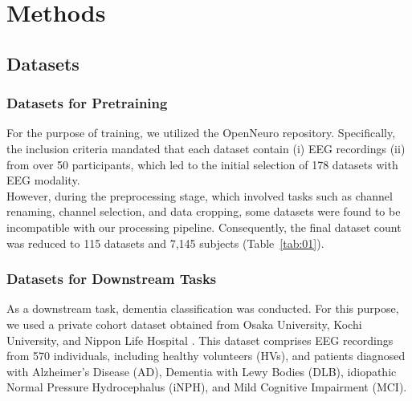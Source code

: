 \section{Methods}
\subsection{Datasets}
\subsubsection{Datasets for Pretraining}
For the purpose of training, we utilized the OpenNeuro repository. Specifically, the inclusion criteria mandated that each dataset contain (i) EEG recordings (ii) from over 50 participants, which led to the initial selection of 178 datasets with EEG modality. \cite{ds004902:1.0.0} \cite{ds004883:1.0.0} \cite{ds004771:1.0.0} \cite{ds004718:1.0.4} \cite{ds004626:1.0.2} \cite{ds004602:1.0.1} \cite{ds004595:1.0.0} \cite{ds004584:1.0.0} \cite{ds004580:1.0.0} \cite{ds004579:1.0.0} \cite{ds004577:1.0.1} \cite{ds004574:1.0.0} \cite{ds004572:1.2.0} \cite{ds004532:1.2.0} \cite{ds004515:1.0.0} \cite{ds004504:1.0.6} \cite{ds004448:1.0.2} \cite{ds004395:2.0.0} \cite{ds004362:1.0.0} \cite{ds004317:1.0.3} \cite{ds004315:1.0.0} \cite{ds004279:1.1.1} \cite{ds004256:1.0.5} \cite{ds004186:2.0.0} \cite{ds004166:1.0.0} \cite{ds004151:1.0.0} \cite{ds004148:1.0.1} \cite{ds004120:1.0.0} \cite{ds004118:1.0.1} \cite{ds004067:1.0.1} \cite{ds004019:1.0.0} \cite{ds003969:1.0.0} \cite{ds003947:1.0.1} \cite{ds003944:1.0.1} \cite{ds003838:1.0.5} \cite{ds003825:1.2.0} \cite{ds003775:1.2.1} \cite{ds003690:1.0.0} \cite{ds003655:1.0.2} \cite{ds003638:1.0.0} \cite{ds003602:1.0.1} \cite{ds003523:1.1.0} \cite{ds003522:1.1.0} \cite{ds003518:1.1.0} \cite{ds003509:1.1.0} \cite{ds003506:1.1.0} \cite{ds003490:1.1.0} \cite{ds003478:1.1.0} \cite{ds003474:1.1.0}
\\
\indent
However, during the preprocessing stage, which involved tasks such as channel renaming, channel selection, and data cropping, some datasets were found to be incompatible with our processing pipeline. Consequently, the final dataset count was reduced to 115 datasets and 7,145 subjects (Table~\ref{tab:01}).
\\
\indent
\subsubsection{Datasets for Downstream Tasks}
As a downstream task, dementia classification was conducted. For this purpose, we used a private cohort dataset obtained from Osaka University, Kochi University, and Nippon Life Hospital \cite{hata_precise_2023} \cite{watanabe_deep_2024}. This dataset comprises EEG recordings from 570 individuals, including healthy volunteers (HVs), and patients diagnosed with Alzheimer's Disease (AD), Dementia with Lewy Bodies (DLB), idiopathic Normal Pressure Hydrocephalus (iNPH), and Mild Cognitive Impairment (MCI).

